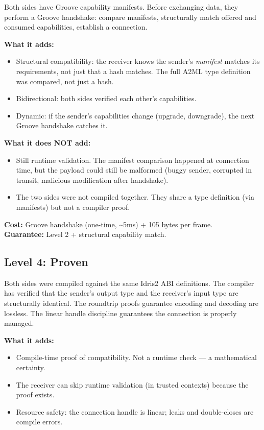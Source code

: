 \documentclass[11pt,a4paper]{article}
\begin{document}
Both sides have Groove capability manifests. Before exchanging data,
they perform a Groove handshake: compare manifests, structurally match
offered and consumed capabilities, establish a connection.

\textbf{What it adds:}
\begin{itemize}
\item Structural compatibility: the receiver knows the sender's
  \emph{manifest} matches its requirements, not just that a hash
  matches. The full A2ML type definition was compared, not just a hash.
\item Bidirectional: both sides verified each other's capabilities.
\item Dynamic: if the sender's capabilities change (upgrade, downgrade),
  the next Groove handshake catches it.
\end{itemize}

\textbf{What it does NOT add:}
\begin{itemize}
\item Still runtime validation. The manifest comparison happened at
  connection time, but the payload could still be malformed (buggy
  sender, corrupted in transit, malicious modification after handshake).
\item The two sides were not compiled together. They share a type
  definition (via manifests) but not a compiler proof.
\end{itemize}

\textbf{Cost:} Groove handshake (one-time, \textasciitilde 5ms) + 105
bytes per frame.\\
\textbf{Guarantee:} Level 2 + structural capability match.

\subsection{Level 4: Proven}

Both sides were compiled against the same Idris2 ABI definitions. The
compiler has verified that the sender's output type and the receiver's
input type are structurally identical. The roundtrip proofs guarantee
encoding and decoding are lossless. The linear handle discipline
guarantees the connection is properly managed.

\textbf{What it adds:}
\begin{itemize}
\item Compile-time proof of compatibility. Not a runtime check --- a
  mathematical certainty.
\item The receiver can skip runtime validation (in trusted contexts)
  because the proof exists.
\item Resource safety: the connection handle is linear; leaks and
  double-closes are compile errors.
\end{itemize}
\end{document}
